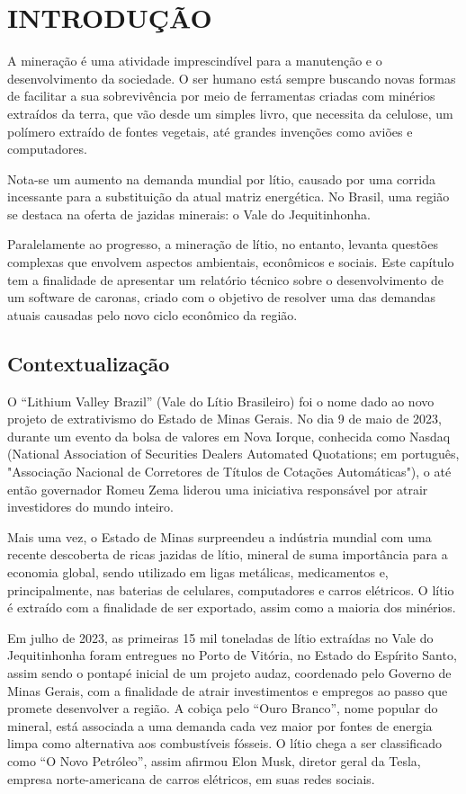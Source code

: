 \chapter{INTRODUÇÃO}

A mineração é uma atividade imprescindível para a manutenção e o desenvolvimento da sociedade. O ser humano está sempre buscando novas formas de facilitar a sua sobrevivência por meio de ferramentas criadas com minérios extraídos da terra, que vão desde um simples livro, que necessita da celulose, um polímero extraído de fontes vegetais, até grandes invenções como aviões e computadores.

Nota-se um aumento na demanda mundial por lítio, causado por uma corrida incessante para a substituição da atual matriz energética. No Brasil, uma região se destaca na oferta de jazidas minerais: o Vale do Jequitinhonha.

Paralelamente ao progresso, a mineração de lítio, no entanto, levanta questões complexas que envolvem aspectos ambientais, econômicos e sociais. Este capítulo tem a finalidade de apresentar um relatório técnico sobre o desenvolvimento de um software de caronas, criado com o objetivo de resolver uma das demandas atuais causadas pelo novo ciclo econômico da região.



\section{Contextualização}

O “Lithium Valley Brazil” (Vale do Lítio Brasileiro) foi o nome dado ao novo projeto de extrativismo do Estado de Minas Gerais. No dia 9 de maio de 2023, durante um evento da bolsa de valores em Nova Iorque, conhecida como Nasdaq (National Association of Securities Dealers Automated Quotations; em português, "Associação Nacional de Corretores de Títulos de Cotações Automáticas"), o até então governador Romeu Zema liderou uma iniciativa responsável por atrair investidores do mundo inteiro. 

Mais uma vez, o Estado de Minas surpreendeu a indústria mundial com uma recente descoberta de ricas jazidas de lítio, mineral de suma importância para a economia global, sendo utilizado em ligas metálicas, medicamentos e, principalmente, nas baterias de celulares, computadores e carros elétricos. O lítio é extraído com a finalidade de ser exportado, assim como a maioria dos minérios.

Em julho de 2023, as primeiras 15 mil toneladas de lítio extraídas no Vale do Jequitinhonha foram entregues no Porto de Vitória, no Estado do Espírito Santo, assim sendo o pontapé inicial de um projeto audaz, coordenado pelo Governo de Minas Gerais, com a finalidade de atrair investimentos e empregos ao passo que promete desenvolver a região. A cobiça pelo “Ouro Branco”, nome popular do mineral, está associada a uma demanda cada vez maior por fontes de energia limpa como alternativa aos combustíveis fósseis. O lítio chega a ser classificado como “O Novo Petróleo”, assim afirmou Elon Musk, diretor geral da Tesla, empresa norte-americana de carros elétricos, em suas redes sociais.

